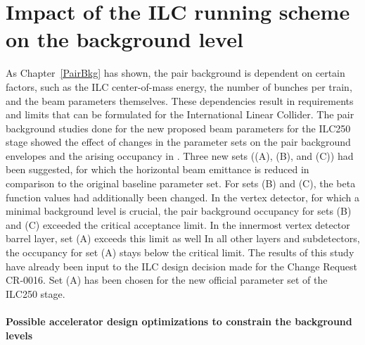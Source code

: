 \section{Impact of the ILC running scheme on the background level}

As Chapter~\ref{PairBkg} has shown, the pair background is dependent on certain factors, such as the ILC center-of-mass energy, the number of bunches per train, and the beam parameters themselves.
These dependencies result in requirements and limits that can be formulated for the International Linear Collider.
The pair background studies done for the new proposed beam parameters for the ILC250 stage showed the effect of changes in the parameter sets on the pair background envelopes and the arising occupancy in \sid.
Three new sets ((A), (B), and (C)) had been suggested, for which the horizontal beam emittance is reduced in comparison to the original baseline parameter set.
For sets (B) and (C), the beta function values had additionally been changed.
In the \sid vertex detector, for which a minimal background level is crucial, the pair background occupancy for sets (B) and (C) exceeded the critical acceptance limit.
In the innermost vertex detector barrel layer, set (A) exceeds this limit as well
In all other layers and \sid subdetectors, the occupancy for set (A) stays below the critical limit.
The results of this study have already been input to the ILC design decision made for the Change Request CR-0016.
Set (A) has been chosen for the new official parameter set of the ILC250 stage.

\paragraph{Possible accelerator design optimizations to constrain the background levels}

